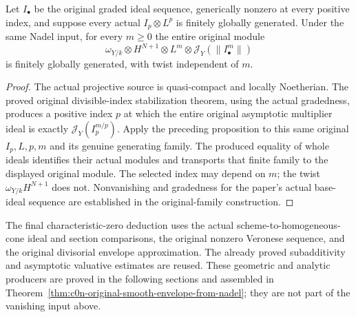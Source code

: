 \begin{proposition}
\label{prop:c0n-asymptotic-uniform-generation}
\leanok
{}
Let $I_\bullet$ be the original graded ideal sequence, generically
nonzero at every positive index, and suppose every actual
$I_p\otimes L^p$ is finitely globally generated.  Under the same Nadel
input, for every $m\geq0$ the entire original module
\[
 \omega_{Y/k}\otimes H^{N+1}\otimes L^m
        \otimes\mathcal J_Y(\|I_\bullet^m\|)
\]
is finitely globally generated, with twist independent of $m$.
\end{proposition}
\begin{proof}
The actual projective source is quasi-compact and locally Noetherian.
The proved original divisible-index stabilization theorem, using the
actual gradedness, produces a positive index $p$ at which the entire
original asymptotic multiplier ideal is exactly
$\mathcal J_Y(I_p^{m/p})$.  Apply the preceding proposition to this
same original $I_p,L,p,m$ and its genuine generating family.  The
produced equality of whole ideals identifies their actual modules and
transports that finite family to the displayed original module.
The selected index may depend on $m$; the twist $\omega_{Y/k}H^{N+1}$
does not.  Nonvanishing and gradedness for the paper's actual base-ideal sequence
are established in the original-family construction.
\end{proof}

The final characteristic-zero deduction uses the actual
scheme-to-homogeneous-cone ideal and section comparisons, the original
nonzero Veronese sequence, and the original divisorial envelope
approximation.  The already proved subadditivity and asymptotic valuative
estimates are reused.  These geometric and analytic producers are proved in the following
sections and assembled in Theorem~\ref{thm:c0n-original-smooth-envelope-from-nadel};
they are not part of the vanishing input above.
